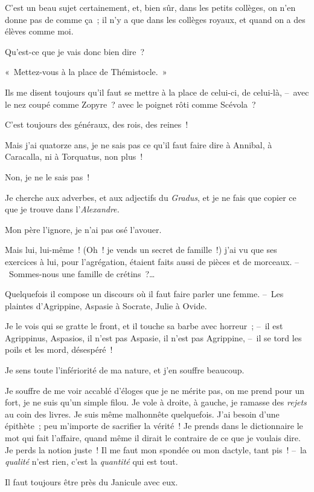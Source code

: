 \documentclass[french,twoside]{book} %
\begin{document}
C’est un beau sujet certainement, et, bien sûr, dans les petits collèges, on n’en donne pas de comme ça ; il n’y a que dans les collèges royaux, et quand on a des élèves comme moi.\par
Qu’est-ce que je vais donc bien dire ?\par
« Mettez-vous à la place de Thémistocle. »\par
Ils me disent toujours qu’il faut se mettre à la place de celui-ci, de celui-là, – avec le nez coupé comme Zopyre ? avec le poignet rôti comme Scévola ?\par
C’est toujours des généraux, des rois, des reines !\par
Mais j’ai quatorze ans, je ne sais pas ce qu’il faut faire dire à Annibal, à Caracalla, ni à Torquatus, non plus !\par
Non, je ne le sais pas !\par
Je cherche aux adverbes, et aux adjectifs du \emph{Gradus}, et je ne fais que copier ce que je trouve dans l’\emph{Alexandre.}\par
Mon père l’ignore, je n’ai pas osé l’avouer.\par
Mais lui, lui-même ! (Oh ! je vends un secret de famille !) j’ai vu que ses exercices à lui, pour l’agrégation, étaient faits aussi de pièces et de morceaux. – Sommes-nous une famille de crétins ?…\par
Quelquefois il compose un discours où il faut faire parler une femme. – Les plaintes d’Agrippine, Aspasie à Socrate, Julie à Ovide.\par
Je le vois qui se gratte le front, et il touche sa barbe avec horreur ; – il est Agrippinus, Aspasios, il n’est pas Aspasie, il n’est pas Agrippine, – il se tord les poils et les mord, désespéré !\par
Je sens toute l’infériorité de ma nature, et j’en souffre beaucoup.\par
Je souffre de me voir accablé d’éloges que je ne mérite pas, on me prend pour un fort, je ne suis qu’un simple filou. Je vole à droite, à gauche, je ramasse des \emph{rejets} au coin des livres. Je suis même malhonnête quelquefois. J’ai besoin d’une épithète ; peu m’importe de sacrifier la vérité ! Je prends dans le dictionnaire le mot qui fait l’affaire, quand même il dirait le contraire de ce que je voulais dire. Je perds la notion juste ! Il me faut mon spondée ou mon dactyle, tant pis ! – la \emph{qualité} n’est rien, c’est la \emph{quantité} qui est tout.\par
\bigbreak
\noindent Il faut toujours être près du Janicule avec eux.\par
\end{document}
